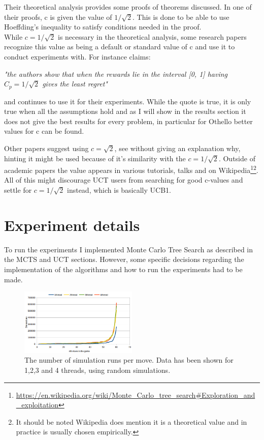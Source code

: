 \documentclass[
11pt, %
english, %
singlespacing, %
headsepline, %
]{MastersDoctoralThesis} %
\begin{document}
Their theoretical analysis provides some proofs of theorems discussed. In one of their proofs, c is given the value of $1/\sqrt{2}$. This is done to be able to use Hoeffding's inequality to satisfy conditions needed in the proof.\\

While $c = 1/\sqrt{2}$ is necessary in the theoretical analysis, some research papers recognize this value as being a default or standard value of c and use it to conduct experiments with. For instance \cite{finnsson2011game} claims:
\begin{displayquote}
\textit{"the authors show that when the rewards lie in the interval [0, 1] having $C_p = 1/\sqrt{2}$ gives the least regret"}
\end{displayquote}

and continues to use it for their experiments. While the quote is true, it is only true when all the assumptions hold and as I will show in the results section it does not give the best results for every problem, in particular for Othello better values for c can be found.

Other papers suggest using $c = \sqrt{2}$, see \cite{de2016monte} without giving an explanation why, hinting it might be used because of it's similarity with the $c = 1/\sqrt{2}$. Outside of academic papers the value appears in various tutorials, talks and on Wikipedia\footnote{\url{https://en.wikipedia.org/wiki/Monte_Carlo_tree_search\#Exploration_and_exploitation}}\footnote{It should be noted Wikipedia does mention it is a theoretical value and in practice is usually chosen empirically.}.\\

All of this might discourage UCT users from searching for good c-values and settle for $c = 1/\sqrt{2}$ instead, which is basically UCB1.


\chapter{Experiment details}
To run the experiments I implemented Monte Carlo Tree Search as described in the MCTS and UCT sections. However, some specific decisions regarding the implementation of the algorithms and how to run the experiments had to be made.

\begin{figure}[h]
	\centering
	\includegraphics[width=0.5\textwidth]{images/mcts-simulations-threads}
	\caption{The number of simulation runs per move. Data has been shown for 1,2,3 and 4 threads, using random simulations.}
	\label{fig:mcts-threads}
\end{figure}
\end{document}
